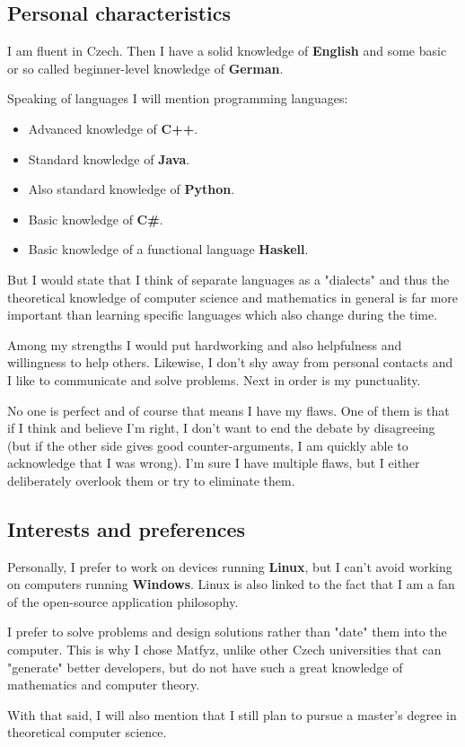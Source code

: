 \documentclass[12pt,a4paper]{article}
\begin{document}
\subsection*{Personal characteristics}

I am fluent in Czech. Then I have a solid knowledge of \textbf{English} and some basic or so called beginner-level knowledge of \textbf{German}.

Speaking of languages I will mention programming languages:

\begin{itemize}
	\item Advanced knowledge of \textbf{C++}.
	\item Standard knowledge of \textbf{Java}.
	\item Also standard knowledge of \textbf{Python}.
	\item Basic knowledge of \textbf{C\#}.
	\item Basic knowledge of a functional language \textbf{Haskell}.
\end{itemize}

But I would state that I think of separate languages as a "dialects" and thus the theoretical knowledge of computer science and mathematics in general is far more important than learning specific languages which also change during the time.

Among my strengths I would put hardworking and also helpfulness and willingness to help others. Likewise, I don't shy away from personal contacts and I like to communicate and solve problems. Next in order is my punctuality.

No one is perfect and of course that means I have my flaws. One of them is that if I think and believe I'm right, I don't want to end the debate by disagreeing (but if the other side gives good counter-arguments, I am quickly able to acknowledge that I was wrong). I'm sure I have multiple flaws, but I either deliberately overlook them or try to eliminate them.

\subsection*{Interests and preferences}

Personally, I prefer to work on devices running \textbf{Linux}, but I can't avoid working on computers running \textbf{Windows}. Linux is also linked to the fact that I am a fan of the open-source application philosophy.

I prefer to solve problems and design solutions rather than "date" them into the computer. This is why I chose Matfyz, unlike other Czech universities that can "generate" better developers, but do not have such a great knowledge of mathematics and computer theory.

With that said, I will also mention that I still plan to pursue a master's degree in theoretical computer science.
\end{document}
